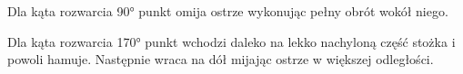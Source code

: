 \documentclass[a4paper; 12pt]{article}
\begin{document}
Dla kąta rozwarcia \ang{90} punkt omija ostrze wykonując pełny obrót wokół niego.

Dla kąta rozwarcia \ang{170} punkt wchodzi daleko na lekko nachyloną część
stożka i powoli hamuje.
Następnie wraca na dół mijając ostrze w większej odległości.

\end{document}
